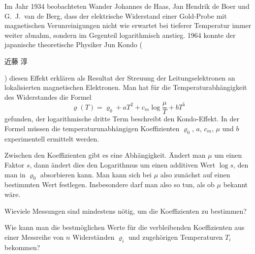 Im Jahr 1934 beobachteten Wander Johannes de Haas, Jan Hendrik de Boer
und G.~J.~van de Berg, dass der elektrische Widerstand einer 
Gold-Probe mit magnetischen Verunreinigungen nicht wie erwartet bei
tieferer Temperatur immer weiter abnahm, sondern im Gegenteil
logarithmisch anstieg.
1964 konnte der japanische theoretische Physiker Jun Kondo
(\begin{CJK}{UTF8}{min}
近藤\; 淳
\end{CJK})
diesen Effekt erklären als Resultat der Streuung der Leitungselektronen
an lokalisierten magnetischen Elektronen.
Man hat für die Temperaturabhängigkeit des Widerstandes die Formel
\[
\varrho(T)
=
\varrho_0 + aT^2 + c_m\log \frac{\mu}{T} + bT^5
\]
gefunden, der logarithmische dritte Term beschreibt den Kondo-Effekt.
In der Formel müssen die temperaturunabhängigen Koeffizienten
$\varrho_0$, $a$, $c_m$, $\mu$ und $b$ experimentell ermittelt werden.

Zwischen den Koeffizienten gibt es eine Abhängigkeit.
Ändert man $\mu$ um einen Faktor $s$, dann ändert dies den Logarithmus
um einen additiven Wert $\log s$, den man in $\varrho_0$ absorbieren kann.
Man kann sich bei $\mu$ also zunächst auf einen bestimmten Wert festlegen.
Insbesondere darf man also so tun, als ob $\mu$ bekannt wäre.

\begin{teilaufgaben}
\item
Wieviele Messungen sind mindestens nötig, um die Koeffizienten zu bestimmen?
\item
Wie kann man die bestmöglichen Werte für die verbleibenden Koeffizienten
aus einer Messreihe von $n$ Widerständen $\varrho_i$ und zugehörigen
Temperaturen $T_i$ bekommen?
\end{teilaufgaben}

